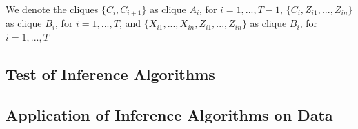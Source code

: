 We denote the cliques $\{C_i,C_{i+1}\}$ as clique $A_i$, for $i=1,...,T-1$, $\{C_i, Z_{i1},...,Z_{in}\}$ as clique $B_i$, for $i=1,...,T$, and $\{ X_{i1},...,X_{in},Z_{i1},...,Z_{in}\}$ as clique $B_i$, for $i=1,...,T$

\subsection{Test of Inference Algorithms}

\subsection{Application of Inference Algorithms on Data}

